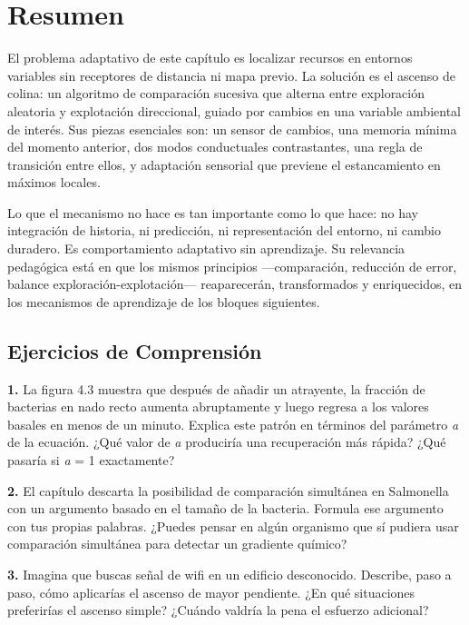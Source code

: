 \documentclass[
  letterpaper,
  DIV=11,
  numbers=noendperiod]{scrreprt}
\begin{document}

\chapter{Resumen}\label{resumen-1}

El problema adaptativo de este capítulo es localizar recursos en
entornos variables sin receptores de distancia ni mapa previo. La
solución es el ascenso de colina: un algoritmo de comparación sucesiva
que alterna entre exploración aleatoria y explotación direccional,
guiado por cambios en una variable ambiental de interés. Sus piezas
esenciales son: un sensor de cambios, una memoria mínima del momento
anterior, dos modos conductuales contrastantes, una regla de transición
entre ellos, y adaptación sensorial que previene el estancamiento en
máximos locales.

Lo que el mecanismo no hace es tan importante como lo que hace: no hay
integración de historia, ni predicción, ni representación del entorno,
ni cambio duradero. Es comportamiento adaptativo sin aprendizaje. Su
relevancia pedagógica está en que los mismos principios ---comparación,
reducción de error, balance exploración-explotación--- reaparecerán,
transformados y enriquecidos, en los mecanismos de aprendizaje de los
bloques siguientes.

\section{Ejercicios de
Comprensión}\label{ejercicios-de-comprensiuxf3n-1}

\textbf{1.} La figura 4.3 muestra que después de añadir un atrayente, la
fracción de bacterias en nado recto aumenta abruptamente y luego regresa
a los valores basales en menos de un minuto. Explica este patrón en
términos del parámetro \emph{a} de la ecuación. ¿Qué valor de \emph{a}
produciría una recuperación más rápida? ¿Qué pasaría si \emph{a} = 1
exactamente?

\textbf{2.} El capítulo descarta la posibilidad de comparación
simultánea en Salmonella con un argumento basado en el tamaño de la
bacteria. Formula ese argumento con tus propias palabras. ¿Puedes pensar
en algún organismo que sí pudiera usar comparación simultánea para
detectar un gradiente químico?

\textbf{3.} Imagina que buscas señal de wifi en un edificio desconocido.
Describe, paso a paso, cómo aplicarías el ascenso de mayor pendiente.
¿En qué situaciones preferirías el ascenso simple? ¿Cuándo valdría la
pena el esfuerzo adicional?
\end{document}
